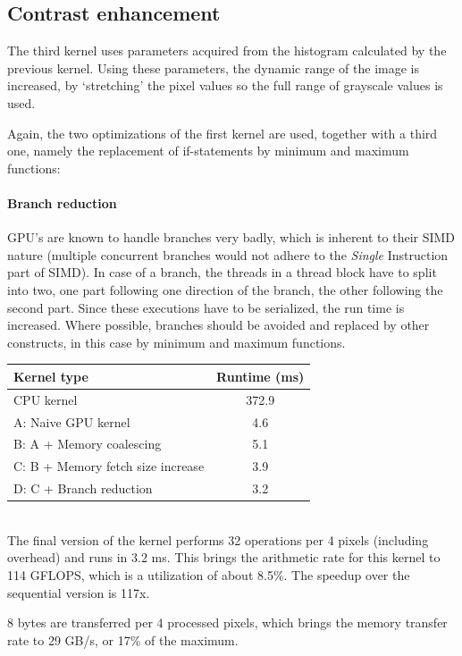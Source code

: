 \documentclass[11pt,a4paper]{article}
\begin{document}
\subsection{Contrast enhancement}
The third kernel uses parameters acquired from the histogram calculated by the previous kernel. Using these parameters, the dynamic range of the image is increased, by `stretching' the pixel values so the full range of grayscale values is used.

Again, the two optimizations of the first kernel are used, together with a third one, namely the replacement of if-statements by minimum and maximum functions:

\paragraph{Branch reduction}
GPU's are known to handle branches very badly, which is inherent to their SIMD nature (multiple concurrent branches would not adhere to the \emph{Single} Instruction part of SIMD). In case of a branch, the threads in a thread block have to split into two, one part following one direction of the branch, the other following the second part. Since these executions have to be serialized, the run time is increased. Where possible, branches should be avoided and replaced by other constructs, in this case by minimum and maximum functions. \\

\begin{tabular}{ | l | S | }
	\hline
	\textbf{Kernel type} & \textbf{Runtime (ms)} \\
	\hline                       
	CPU kernel & 372.9 \\
	\hline
	A: Naive GPU kernel & 4.6 \\
	\hline
	B: A + Memory coalescing & 5.1 \\
	\hline
	C: B + Memory fetch size increase & 3.9 \\
	\hline
	D: C + Branch reduction & 3.2 \\
	\hline
\end{tabular} \\

The final version of the kernel performs 32 operations per 4 pixels (including overhead) and runs in 3.2 ms. This brings the arithmetic rate for this kernel to 114 GFLOPS, which is a utilization of about 8.5\%. The speedup over the sequential version is 117x.

8 bytes are transferred per 4 processed pixels, which brings the memory transfer rate to 29 GB/s, or 17\% of the maximum. 
\end{document}
